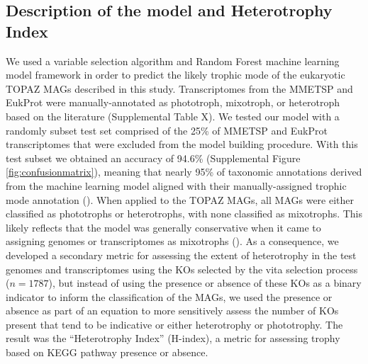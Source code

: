\documentclass[12pt]{article}
\numberwithin{equation}{section}
\begin{document}
\subsection{Description of the model and Heterotrophy Index}
We used a variable selection algorithm and Random Forest machine learning model framework in order to predict the likely trophic mode of the eukaryotic TOPAZ MAGs described in this study. Transcriptomes from the MMETSP and EukProt were manually-annotated as phototroph, mixotroph, or heterotroph based on the literature (Supplemental Table X). We tested our model with a randomly subset test set comprised of the 25\% of MMETSP and EukProt transcriptomes \citep{Keeling2014,Richter2020EukProt} that were excluded from the model building procedure. With this test subset we obtained an accuracy of 94.6\% (Supplemental Figure \ref{fig:confusionmatrix}), meaning that nearly 95\% of taxonomic annotations derived from the machine learning model aligned with their manually-assigned trophic mode annotation ().  When applied to the TOPAZ MAGs, all MAGs were either classified as phototrophs or heterotrophs, with none classified as  mixotrophs. This likely reflects that the model was generally conservative when it came to assigning genomes or transcriptomes as mixotrophs (). As a consequence, we developed a secondary metric for assessing the extent of heterotrophy in the test genomes and transcriptomes using the KOs selected by the vita selection process ($n=1787$), but instead of using the presence or absence of these KOs as a binary indicator to inform the classification of the MAGs, we used the presence or absence as part of an equation to more sensitively assess the number of KOs present that tend to be indicative or either heterotrophy or phototrophy. The result was the ``Heterotrophy Index'' (H-index), a metric for assessing trophy based on KEGG pathway presence or absence. 
\end{document}

